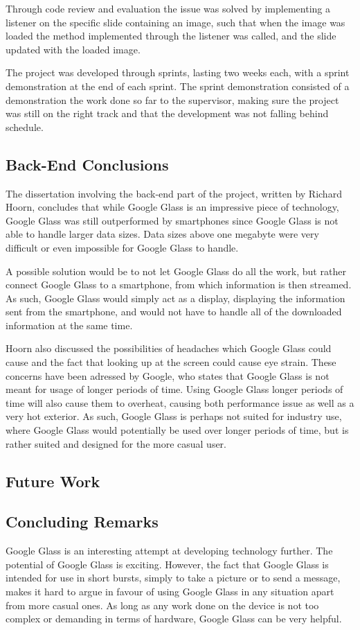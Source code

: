 Through code review and evaluation the issue was solved by implementing a listener on the specific slide containing an image, such that when the image was loaded the method implemented through the listener was called, and the slide updated with the loaded image.

The project was developed through sprints, lasting two weeks each, with a sprint demonstration at the end of each sprint. The sprint demonstration consisted of a demonstration the work done so far to the supervisor, making sure the project was still on the right track and that the development was not falling behind schedule.

\subsection{Back-End Conclusions}
The dissertation involving the back-end part of the project, written by Richard Hoorn, concludes that while Google Glass is an impressive piece of technology, Google Glass was still outperformed by smartphones since Google Glass is not able to handle larger data sizes. Data sizes above one megabyte were very difficult or even impossible for Google Glass to handle.

A possible solution would be to not let Google Glass do all the work, but rather connect Google Glass to a smartphone, from which information is then streamed. As such, Google Glass would simply act as a display, displaying the information sent from the smartphone, and would not have to handle all of the downloaded information at the same time.

Hoorn also discussed the possibilities of headaches which Google Glass could cause and the fact that looking up at the screen could cause eye strain. These concerns have been adressed by Google, who states that Google Glass is not meant for usage of longer periods of time. Using Google Glass longer periods of time will also cause them to overheat, causing both performance issue as well as a very hot exterior. As such, Google Glass is perhaps not suited for industry use, where Google Glass would potentially be used over longer periods of time, but is rather suited and designed for the more casual user.

\subsection{Future Work}
\label{subsec:futurework}


\subsection{Concluding Remarks}
Google Glass is an interesting attempt at developing technology further. The potential of Google Glass is exciting. However, the fact that Google Glass is intended for use in short bursts, simply to take a picture or to send a message, makes it hard to argue in favour of using Google Glass in any situation apart from more casual ones. As long as any work done on the device is not too complex or demanding in terms of hardware, Google Glass can be very helpful.

